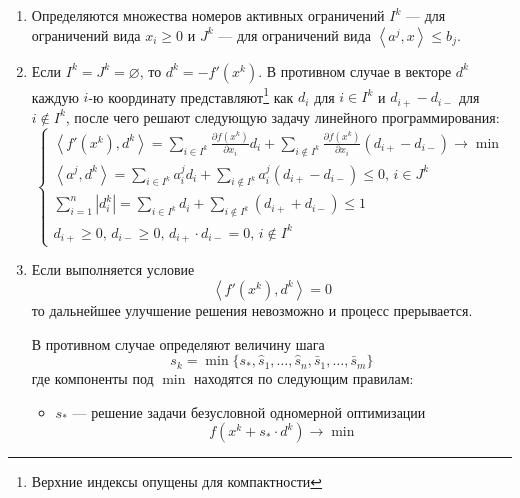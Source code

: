 \documentclass{article}
\renewcommand{\leq}{\leqslant}
\renewcommand{\geq}{\geqslant}
\newcommand{\suml}{\sum\limits}
\newcommand{\pardiff}[2]{\frac{\partial{#1}}{\partial{#2}}}
\newcommand{\abs}[1]{\left \lvert{#1}\right \rvert}
\newcommand{\mul}{\cdot}
\newcommand{\scalmult}[1]{{\left \langle #1 \right \rangle}}
\theoremstyle{remark}
\theoremstyle{definition}
\numberwithin{equation}{section}
\begin{document}
\begin{enumerate}
  \renewcommand{\labelenumi}{\textbf{Шаг \arabic{enumi}.}}
\item Определяются множества номеров активных ограничений $I^k$ — для
  ограничений вида $x_i \geq 0$ и $J^k$ — для ограничений вида
  $\scalmult{a^j,x} \leq b_j$.
\item Если $I^k=J^k = \varnothing$, то $d^k=-f'(x^k)$. В противном
  случае в векторе $d^k$ каждую $i$-ю координату
  представляют\footnote{Верхние индексы опущены для компактности} как
  $d_i$ для $i \in I^k$ и $d_{i+}-d_{i-}$ для $i \notin I^k$, после
  чего решают следующую задачу линейного программирования:
  \begin{equation}
    \label{eq:zoutendijk-linprog}
    \begin{cases}
      \scalmult{f'(x^k), d^k} = 
      \suml_{i\in I^k}{\pardiff{f(x^k)}{x_i}d_i} + 
      \suml_{i \notin I^k}{\pardiff{f(x^k)}{x_i}(d_{i+}-d_{i-})}
      \to \min\\
      
      \scalmult{a^j, d^k} = 
      \suml_{i\in I^k}{a^j_id_i} +
      \suml_{i \notin I^k}{a^j_i(d_{i+}-d_{i-})} \leq 0,
      \, i\in J^k \\
      
      \suml_{i=1}^n\abs{d_i^k} = \suml_{i\in I^k}{d_i}+
      \suml_{i \notin I^k}{\left( d_{i+} + d_{i-}\right)} \leq 1\\
      
      d_{i+} \geq 0,\, d_{i-} \geq 0,\,d_{i+}\mul d_{i-}=0,\, i\notin I^k
    \end{cases}
  \end{equation}
\item Если выполняется условие
  \begin{equation}
    \label{eq:zoutendijk-halt}
    \scalmult{f'(x^k), d^k} = 0
  \end{equation}
  то дальнейшее улучшение решения невозможно и процесс прерывается.

  В противном случае определяют величину шага
  \begin{equation}
    \label{eq:zoutendijk-step}
    s_k =
    \min\{s_*,\hat{s}_1,\dotsc,\hat{s}_n,\bar{s}_1,\dotsc,\bar{s}_m\}
  \end{equation}
  где компоненты под $\min$ находятся по следующим правилам:
  \begin{itemize}
  \item $s_*$ — решение задачи безусловной одномерной оптимизации
    \begin{equation*} 
      f(x^k+s_* \mul d^k) \to \min
    \end{equation*}


\end{itemize}
\end{enumerate}
\end{document}
